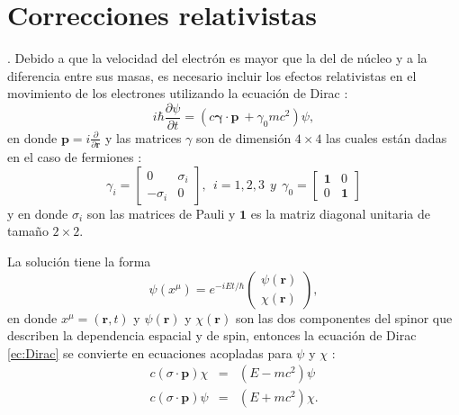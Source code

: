   \chapter{Correcciones relativistas} \label{corrRelApend}.
Debido a que la velocidad del electr\'on es mayor que la del  de n\'ucleo y  a la diferencia entre sus masas, es necesario incluir los efectos relativistas en el movimiento de los electrones utilizando la ecuaci\'on de Dirac \cite{doi:10.1098/rspa.1928.0023, doi:10.1098/rspa.1928.0056}:
\begin{equation}
	i \hbar \frac{\partial \psi}{\partial t} = (c \pmb{\gamma}\cdot \pmb{p} ~+ \gamma_0 m  c^2  ) \psi, \label{ec:Dirac}
\end{equation}
en donde $\pmb{p } = i \frac{\partial}{\partial \pmb{r}}$ y las matrices $\gamma$ son de dimensi\'on $4 \times 4$ las cuales est\'an dadas en el caso de fermiones \cite{Martin-2004}:
\begin{equation}
	\gamma_i = 
	\begin{bmatrix}
		0         & \sigma_i \\
		-\sigma_i &    0
	\end{bmatrix},~~i=1,2,3~~y~~
	\gamma_0 =
	\begin{bmatrix}
		\pmb{1}    &   0 \\
		0       &  \pmb{1}
	\end{bmatrix} \label{ec:GammaMatr}
\end{equation}
y en donde $\sigma_i$ son las matrices de Pauli y $\pmb{1}$ es la matriz diagonal unitaria de tama\~no $2 \times 2$.
\newline
\par La soluci\'on tiene la forma \cite{doi:10.1098/rspa.1928.0056}
\begin{equation}
	\psi(x^{\mu}) = e^{-i E t /\hbar} 
	\begin{pmatrix}
		\psi(\pmb{r}) \\
		\chi(\pmb{r})
	\end{pmatrix} \label{ec:solDir},
\end{equation}
en donde $x^{\mu} = (\pmb{r},t)$ y $\psi (\pmb{r})$ y $\chi (\pmb{r})$ son las dos componentes del spinor que describen la dependencia espacial y de spin, entonces la ecuaci\'on de Dirac \ref{ec:Dirac} se convierte en ecuaciones acopladas para $\psi$ y  $\chi$ \cite{Martin-2004}:
\begin{eqnarray}
	c (\sigma \cdot \pmb{p}) \chi &=& (E-m c^2) \psi \nonumber \\
	c (\sigma \cdot \pmb{p}) \psi &=& (E+m c^2) \chi. \label{ec:sistEqDirac}
\end{eqnarray}
